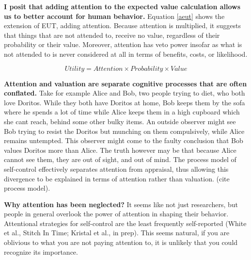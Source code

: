 \documentclass[letterpaper, 12pt]{article}
\begin{document}

\textbf{I posit that adding attention to the expected value calculation allows us to better account for human behavior.} Equation \ref{aeut} shows the extension of EUT, adding attention. Because attention is multiplied, it suggests that things that are not attended to, receive no value, regardless of their probability or their value. Moreover, attention has veto power insofar as what is not attended to is never considered at all in terms of benefits, costs, or likelihood.

\begin{equation} \label{aeut}
    Utility = Attention \times Probability \times Value
\end{equation}


\textbf{Attention and valuation are separate cognitive processes that are often conflated.} Take for example Alice and Bob, two people trying to diet, who both love Doritos. While they both have Doritos at home, Bob keeps them by the sofa where he spends a lot of time while Alice keeps them in a high cupboard which she cant reach, behind some other bulky items. An outside observer might see Bob trying to resist the Doritos but munching on them compulsively, while Alice remains untempted. This observer might come to the faulty conclusion that Bob values Doritos more than Alice. The truth however may be that because Alice cannot see them, they are out of sight, and out of mind. The process model of self-control effectively separates attention from appraisal, thus allowing this divergence to be explained in terms of attention rather than valuation. (cite process model).

\textbf{Why attention has been neglected?} It seems like not just researchers, but people in general overlook the power of attention in shaping their behavior.  Attentional strategies for self-control are the least frequently self-reported (White et al., Stitch In Time; Kristal et al., in prep). This seems natural, if you are oblivious to what you are not paying attention to, it is unlikely that you could recognize its importance.
\end{document}
